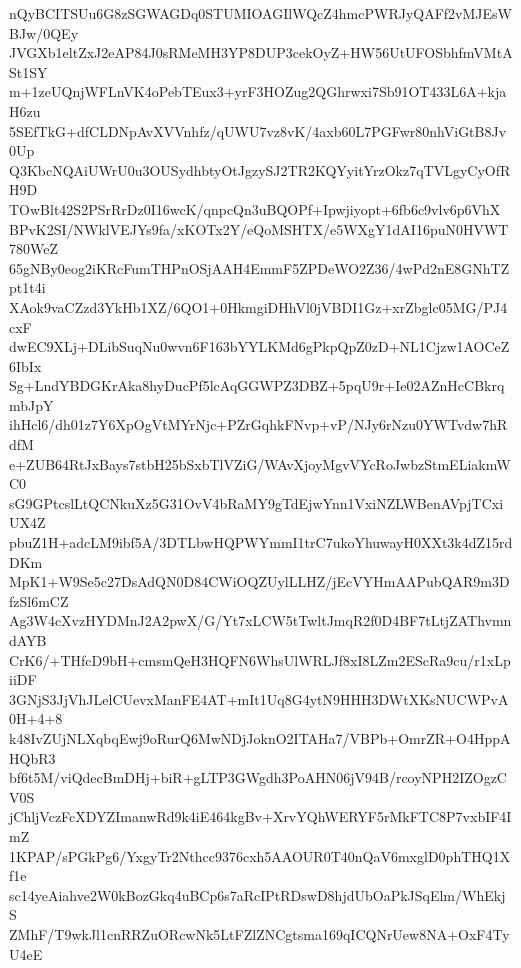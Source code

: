nQyBCITSUu6G8zSGWAGDq0STUMIOAGIlWQcZ4hmcPWRJyQAFf2vMJEsWBJw/0QEy
JVGXb1eltZxJ2eAP84J0sRMeMH3YP8DUP3cekOyZ+HW56UtUFOSbhfmVMtASt1SY
m+1zeUQnjWFLnVK4oPebTEux3+yrF3HOZug2QGhrwxi7Sb91OT433L6A+kjaH6zu
5SEfTkG+dfCLDNpAvXVVnhfz/qUWU7vz8vK/4axb60L7PGFwr80nhViGtB8Jv0Up
Q3KbcNQAiUWrU0u3OUSydhbtyOtJgzySJ2TR2KQYyitYrzOkz7qTVLgyCyOfRH9D
TOwBlt42S2PSrRrDz0I16wcK/qnpcQn3uBQOPf+Ipwjiyopt+6fb6c9vlv6p6VhX
BPvK2SI/NWklVEJYs9fa/xKOTx2Y/eQoMSHTX/e5WXgY1dAI16puN0HVWT780WeZ
65gNBy0eog2iKRcFumTHPnOSjAAH4EmmF5ZPDeWO2Z36/4wPd2nE8GNhTZpt1t4i
XAok9vaCZzd3YkHb1XZ/6QO1+0HkmgiDHhVl0jVBDI1Gz+xrZbglc05MG/PJ4cxF
dwEC9XLj+DLibSuqNu0wvn6F163bYYLKMd6gPkpQpZ0zD+NL1Cjzw1AOCeZ6IbIx
Sg+LndYBDGKrAka8hyDucPf5lcAqGGWPZ3DBZ+5pqU9r+Ie02AZnHcCBkrqmbJpY
ihHcl6/dh01z7Y6XpOgVtMYrNjc+PZrGqhkFNvp+vP/NJy6rNzu0YWTvdw7hRdfM
e+ZUB64RtJxBays7stbH25bSxbTlVZiG/WAvXjoyMgvVYcRoJwbzStmELiakmWC0
sG9GPtcslLtQCNkuXz5G31OvV4bRaMY9gTdEjwYnn1VxiNZLWBenAVpjTCxiUX4Z
pbuZ1H+adcLM9ibf5A/3DTLbwHQPWYmmI1trC7ukoYhuwayH0XXt3k4dZ15rdDKm
MpK1+W9Se5c27DsAdQN0D84CWiOQZUylLLHZ/jEcVYHmAAPubQAR9m3DfzSl6mCZ
Ag3W4cXvzHYDMnJ2A2pwX/G/Yt7xLCW5tTwltJmqR2f0D4BF7tLtjZAThvmndAYB
CrK6/+THfcD9bH+cmsmQeH3HQFN6WhsUlWRLJf8xI8LZm2EScRa9cu/r1xLpiiDF
3GNjS3JjVhJLelCUevxManFE4AT+mIt1Uq8G4ytN9HHH3DWtXKsNUCWPvA0H+4+8
k48IvZUjNLXqbqEwj9oRurQ6MwNDjJoknO2ITAHa7/VBPb+OmrZR+O4HppAHQbR3
bf6t5M/viQdecBmDHj+biR+gLTP3GWgdh3PoAHN06jV94B/rcoyNPH2IZOgzCV0S
jChljVczFcXDYZImanwRd9k4iE464kgBv+XrvYQhWERYF5rMkFTC8P7vxbIF4ImZ
1KPAP/sPGkPg6/YxgyTr2Nthcc9376cxh5AAOUR0T40nQaV6mxglD0phTHQ1Xf1e
sc14yeAiahve2W0kBozGkq4uBCp6s7aRcIPtRDswD8hjdUbOaPkJSqElm/WhEkjS
ZMhF/T9wkJl1cnRRZuORcwNk5LtFZlZNCgtsma169qICQNrUew8NA+OxF4TyU4eE
